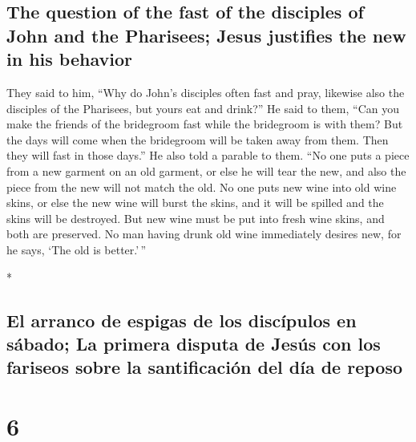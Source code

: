 \begin{paracol}{2}
\begin{otherlanguage}{english}
\hypertarget{the-question-of-the-fast-of-the-disciples-of-john-and-the-pharisees-jesus-justifies-the-new-in-his-behavior}{%
\subsection{The question of the fast of the disciples of John and the
Pharisees; Jesus justifies the new in his
behavior}\label{the-question-of-the-fast-of-the-disciples-of-john-and-the-pharisees-jesus-justifies-the-new-in-his-behavior}}

 They said to him, ``Why do John's disciples often fast
and pray, likewise also the disciples of the Pharisees, but yours eat
and drink?''  He said to them, ``Can you make the friends
of the bridegroom fast while the bridegroom is with them?
 But the days will come when the bridegroom will be taken
away from them. Then they will fast in those days.''  He
also told a parable to them. ``No one puts a piece from a new garment on
an old garment, or else he will tear the new, and also the piece from
the new will not match the old.  No one puts new wine
into old wine skins, or else the new wine will burst the skins, and it
will be spilled and the skins will be destroyed.  But new
wine must be put into fresh wine skins, and both are preserved.
 No man having drunk old wine immediately desires new,
for he says, `The old is better.'\,''

\end{otherlanguage}

\switchcolumn[0]*

\hypertarget{el-arranco-de-espigas-de-los-discuxedpulos-en-suxe1bado-la-primera-disputa-de-jesuxfas-con-los-fariseos-sobre-la-santificaciuxf3n-del-duxeda-de-reposo}{%
\subsection{El arranco de espigas de los discípulos en sábado; La
primera disputa de Jesús con los fariseos sobre la santificación del día
de
reposo}\label{el-arranco-de-espigas-de-los-discuxedpulos-en-suxe1bado-la-primera-disputa-de-jesuxfas-con-los-fariseos-sobre-la-santificaciuxf3n-del-duxeda-de-reposo}}

\hypertarget{section-10}{%
\section{6}\label{section-10}}


\end{paracol}
